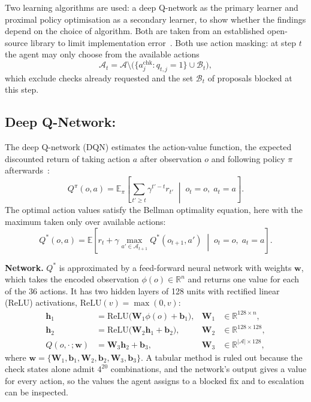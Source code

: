 Two learning algorithms are used: a deep Q-network as the primary learner and proximal policy optimisation as a secondary learner, to show whether the findings depend on the choice of algorithm. Both are taken from an established open-source library to limit implementation error~\cite{raffin2021}. Both use action masking: at step $t$ the agent may only choose from the available actions
\begin{equation}
\mathcal{A}_t = \mathcal{A} \setminus \big( \{ a^{\text{chk}}_j : q_{t,j} = 1 \} \cup \mathcal{B}_t \big),
\label{eq:mask}
\end{equation}
which exclude checks already requested and the set $\mathcal{B}_t$ of proposals blocked at this step.

\subsection{Deep Q-Network:}

The deep Q-network (DQN) estimates the action-value function, the expected discounted return of taking action $a$ after observation $o$ and following policy $\pi$ afterwards~\cite{mnih2015}:
\begin{equation}
Q^{\pi}(o, a) = \mathbb{E}_{\pi}\!\left[ \sum_{t' \ge t} \gamma^{t'-t} r_{t'} \;\middle|\; o_t = o,\; a_t = a \right].
\end{equation}
The optimal action values satisfy the Bellman optimality equation, here with the maximum taken only over available actions:
\begin{equation}
Q^{*}(o, a) = \mathbb{E}\!\left[ r_t + \gamma \max_{a' \in \mathcal{A}_{t+1}} Q^{*}(o_{t+1}, a') \;\middle|\; o_t = o,\; a_t = a \right].
\end{equation}

\textbf{Network.} $Q^{*}$ is approximated by a feed-forward neural network with weights $\mathbf{w}$, which takes the encoded observation $\phi(o) \in \mathbb{R}^{n}$ and returns one value for each of the 36 actions. It has two hidden layers of 128 units with rectified linear (ReLU) activations, $\text{ReLU}(v) = \max(0, v)$:
\begin{align}
\mathbf{h}_1 &= \text{ReLU}\big(\mathbf{W}_1 \phi(o) + \mathbf{b}_1\big), & \mathbf{W}_1 &\in \mathbb{R}^{128 \times n}, \\
\mathbf{h}_2 &= \text{ReLU}\big(\mathbf{W}_2 \mathbf{h}_1 + \mathbf{b}_2\big), & \mathbf{W}_2 &\in \mathbb{R}^{128 \times 128}, \\
Q(o, \cdot\,; \mathbf{w}) &= \mathbf{W}_3 \mathbf{h}_2 + \mathbf{b}_3, & \mathbf{W}_3 &\in \mathbb{R}^{|\mathcal{A}| \times 128},
\end{align}
where $\mathbf{w} = \{\mathbf{W}_1, \mathbf{b}_1, \mathbf{W}_2, \mathbf{b}_2, \mathbf{W}_3, \mathbf{b}_3\}$. A tabular method is ruled out because the check states alone admit $4^{20}$ combinations, and the network's output gives a value for every action, so the values the agent assigns to a blocked fix and to escalation can be inspected.

